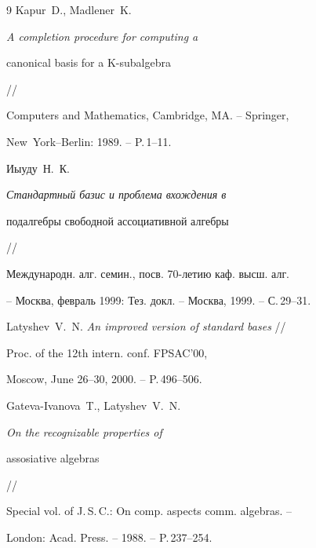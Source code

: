 \begin{thebibliography}{9}
Kapur~D., Madlener~K. {\em A completion procedure for computing a


canonical basis for a {\cal K}-subalgebra} //


Computers and Mathematics, Cambridge, MA. -- Springer, 


New~York--Berlin: 1989. -- P.\,1--11.







Иыуду~Н.~К.


{\em Стандартный базис и проблема вхождения в


подалгебры свободной ассоциативной алгебры} //


Международн. алг.  семин., посв. 70-летию каф. высш. алг.


-- Москва, февраль 1999: Тез. докл. -- Москва, 1999. -- С.\,29--31.







Latyshev~V.~N. {\em An improved version of standard bases} //


Proc. of the 12th intern. conf. FPSAC'00,


Moscow, June 26--30, 2000. -- P.\,496--506.







Gateva-Ivanova~T., Latyshev~V.~N. {\em On the recognizable properties of


assosiative algebras} //


Special vol. of J.\,S.\,C.: On comp. aspects comm. algebras. --


London: Acad. Press. -- 1988. -- P.\,237--254.








\end{thebibliography}





\vskip 2cm














\label{end}











